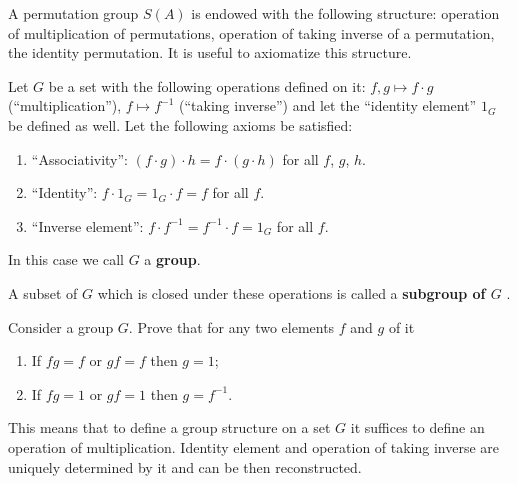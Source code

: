 \documentclass[12pt]{article}
\begin{document}
A permutation group $S(A)$ is endowed with the following structure:
operation of multiplication of permutations, operation of taking
inverse of a permutation, the identity permutation. It is useful to
axiomatize this structure.

\begin{opredelenie}
  Let $G$ be a set with the following operations defined on it: $f, g
  \mapsto f\cdot g$ (``multiplication''), $f\mapsto f^{-1}$ (``taking
  inverse'') and let the ``identity element'' $1_G$ be defined as
  well. Let the following axioms be satisfied:
\begin{enumerate}
\item ``Associativity'': $(f\cdot g) \cdot h= f\cdot (g \cdot h)$
for all $f$, $g$, $h$.

\item ``Identity'': $f \cdot 1_G = 1_G \cdot f = f$ for all $f$.

\item ``Inverse element'': $f \cdot f^{-1} = f^{-1} \cdot f = 1_G$
for all $f$.
\end{enumerate}
In this case we call $G$ a {\bf group}.
\end{opredelenie}

A subset of $G$ which is closed under these operations is called a
{\bf subgroup of $G$ }.

\begin{zadacha} Consider a group $G$. Prove that for any two elements
  $f$ and $g$ of it
\begin{enumerate}
\item If $fg=f$ or $gf=f$ then $g=1$;
\item If $fg=1$ or $gf=1$ then $g=f^{-1}$.
\end{enumerate}
\end{zadacha}

\begin{zamechanie}
  This means that to define a group structure on a set $G$ it suffices
  to define an operation of multiplication. Identity element and
  operation of taking inverse are uniquely determined by it and can be
  then reconstructed.
\end{zamechanie}
\end{document}
